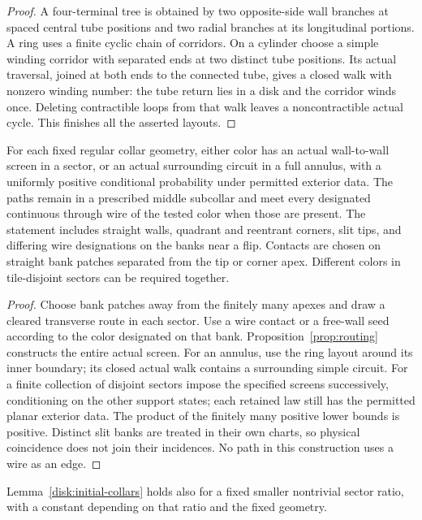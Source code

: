 \begin{proof}
A four-terminal tree is obtained by two opposite-side wall branches
at spaced central tube positions and two radial branches at its
longitudinal portions. A ring uses a finite cyclic chain of corridors.
On a cylinder choose a simple winding corridor with separated ends
at two distinct tube positions. Its actual traversal, joined at both
ends to the connected tube, gives a closed walk with nonzero winding
number: the tube return lies in a disk and the corridor winds once.
Deleting contractible loops from that walk leaves a noncontractible
actual cycle. This finishes all the asserted layouts.
\end{proof}

\begin{proposition}
\label{prop:screens}
For each fixed regular collar geometry, either color has an actual
wall-to-wall screen in a sector, or an actual surrounding circuit in
a full annulus, with a uniformly positive conditional probability
under permitted exterior data. The paths remain in a prescribed
middle subcollar and meet every designated continuous through wire
of the tested color when those are present. The statement includes straight walls,
quadrant and reentrant corners, slit tips, and differing wire
designations on the banks near a flip. Contacts are chosen on
straight bank patches separated from the tip or corner apex.
Different colors in tile-disjoint sectors can be required together.
\end{proposition}

\begin{proof}
Choose bank patches away from the finitely many apexes and draw a
cleared transverse route in each sector. Use a wire contact or a
free-wall seed according to the color designated on that bank.
Proposition~\ref{prop:routing} constructs the entire actual screen.
For an annulus, use the ring layout around its inner boundary; its
closed actual walk contains a surrounding simple circuit. For a
finite collection of disjoint sectors impose the specified screens
successively, conditioning on the other support states; each retained
law still has the permitted planar exterior data. The product of
the finitely many positive lower bounds is positive. Distinct slit
banks are treated in their own charts, so physical coincidence does
not join their incidences. No path in this construction uses a wire
as an edge.
\end{proof}

\begin{lemma}
\label{disk:thin-collars}
Lemma~\ref{disk:initial-collars} holds also for a fixed smaller
nontrivial sector ratio, with a constant depending on that ratio and
the fixed geometry.
\end{lemma}

